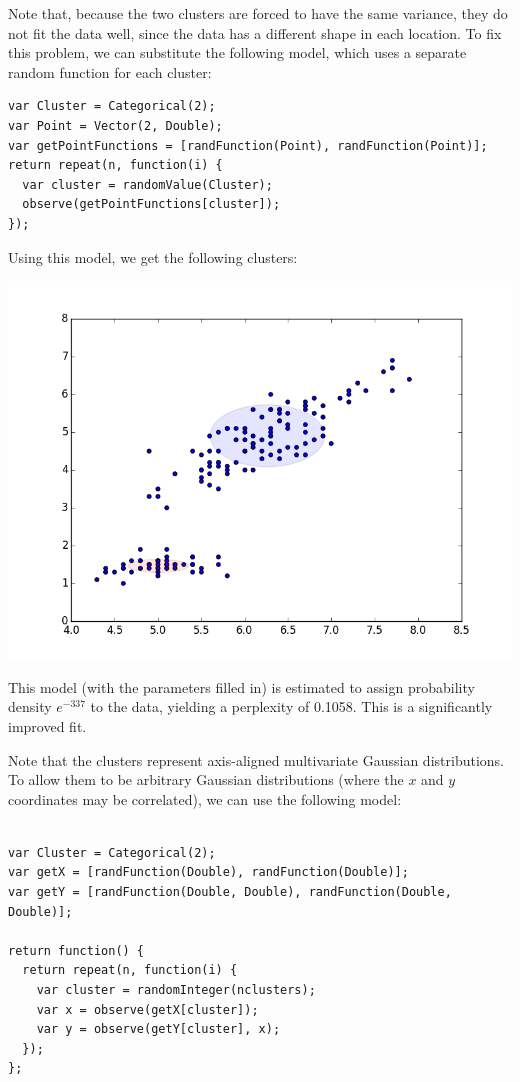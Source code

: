 \documentclass{article}
\begin{document}
  Note that, because the two clusters are forced to have the same variance, they do not fit the data well,
  since the data has a different shape in each location.  To fix this problem, we can substitute the following
  model, which uses a separate random function for each cluster:
  \begin{lstlisting}
var Cluster = Categorical(2);
var Point = Vector(2, Double);
var getPointFunctions = [randFunction(Point), randFunction(Point)];
return repeat(n, function(i) {
  var cluster = randomValue(Cluster);
  observe(getPointFunctions[cluster]);
});
\end{lstlisting}
  Using this model, we get the following clusters:
  \begin{center}
    \includegraphics[scale=0.5]{../plots/irisclusters_indep.png}
  \end{center}
  This model (with the parameters filled in) is estimated to assign probability density $e^{-337}$ to the data, yielding a perplexity of 0.1058.  This is a significantly improved fit.

  Note that the clusters represent axis-aligned multivariate Gaussian distributions.   To allow them to be arbitrary Gaussian distributions (where the $x$ and $y$ coordinates may be correlated),
  we can use the following model:

\begin{lstlisting}

var Cluster = Categorical(2);
var getX = [randFunction(Double), randFunction(Double)];
var getY = [randFunction(Double, Double), randFunction(Double, Double)];

return function() {
  return repeat(n, function(i) {
    var cluster = randomInteger(nclusters);
    var x = observe(getX[cluster]);
    var y = observe(getY[cluster], x);
  });
};
\end{lstlisting}
  
\end{document}
